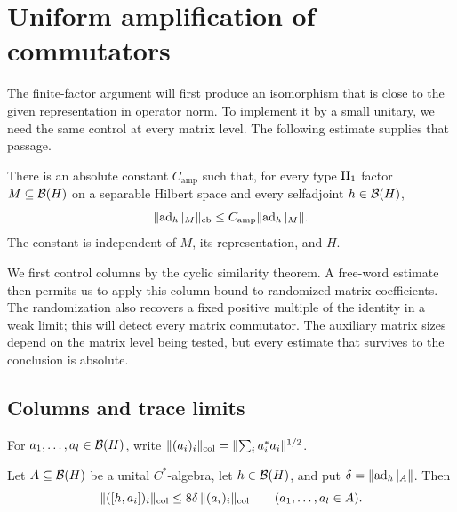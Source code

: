 \section{Uniform amplification of commutators}
\label{sec:amplification}

The finite-factor argument will first produce an isomorphism that is close
to the given representation in operator norm. To implement it by a small
unitary, we need the same control at every matrix level. The following
estimate supplies that passage.

\begin{theorem}\label{thm:amplification}
There is an absolute constant \(C_{\mathrm{amp}}\) such that, for every
type \(\mathrm{II}_1\) factor \(M\subseteq\mathcal B(H)\) on a separable Hilbert space and
every selfadjoint \(h\in\mathcal B(H)\),
\[
 \lVert\operatorname{ad}_h|_M\rVert_{\mathrm{cb}}\le
 C_{\mathrm{amp}}\lVert\operatorname{ad}_h|_M\rVert.
\]
The constant is independent of \(M\), its representation, and \(H\).
\end{theorem}

We first control columns by the cyclic similarity theorem. A free-word
estimate then permits us to apply this column bound to randomized matrix
coefficients. The randomization also recovers a fixed positive multiple
of the identity in a weak limit; this will detect every matrix
commutator. The auxiliary matrix sizes depend on the matrix level being
tested, but every estimate that survives to the conclusion is absolute.

\subsection{Columns and trace limits}

For \(a_1,\ldots,a_l\in\mathcal B(H)\), write
\(\lVert(a_i)_i\rVert_{\mathrm{col}}=\lVert\sum_i a_i^*a_i\rVert^{1/2}\).

\begin{lemma}\label{lem:column-commutator}
Let \(A\subseteq\mathcal B(H)\) be a unital \(C^*\)-algebra, let \(h\in\mathcal B(H)\),
and put \(\delta=\lVert\operatorname{ad}_h|_A\rVert\). Then
\[
 \lVert([h,a_i])_i\rVert_{\mathrm{col}}
 \le 8\delta\,\lVert(a_i)_i\rVert_{\mathrm{col}}
 \qquad(a_1,\ldots,a_l\in A).
\]
\end{lemma}

